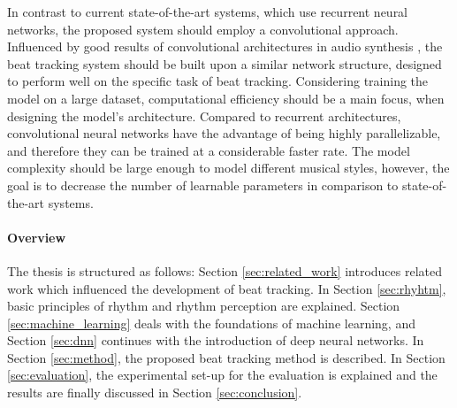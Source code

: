 \documentclass{scrartcl}
\begin{document}
In contrast to current state-of-the-art systems, which use recurrent neural networks, the proposed system should employ a convolutional approach. Influenced by good results of convolutional architectures in audio synthesis \cite{Oord2016}, the beat tracking system should be built upon a similar network structure, designed to perform well on the specific task of beat tracking. Considering training the model on a large dataset, computational efficiency should be a main focus, when designing the model's architecture. Compared to recurrent architectures, convolutional neural networks have the advantage of being highly parallelizable, and therefore they can be trained at a considerable faster rate. The model complexity should be large enough to model different musical styles, however, the goal is to decrease the number of learnable parameters in comparison to state-of-the-art systems.














\paragraph{Overview} The thesis is structured as follows: Section \ref{sec:related_work} introduces related work which influenced the development of beat tracking. In Section \ref{sec:rhyhtm}, basic principles of rhythm and rhythm perception are explained. Section \ref{sec:machine_learning} deals with the foundations of machine learning, and Section \ref{sec:dnn} continues with the introduction of deep neural networks. In Section \ref{sec:method}, the proposed beat tracking method is described. In Section \ref{sec:evaluation}, the experimental set-up for the evaluation is explained and the results are finally discussed in Section \ref{sec:conclusion}. 

\end{document}
